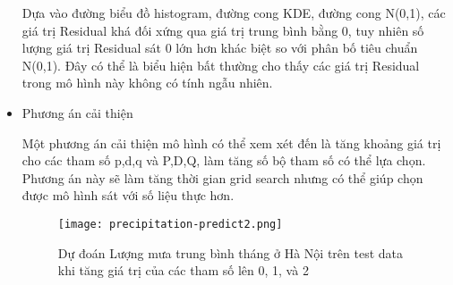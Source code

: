 \documentclass[12pt]{article}
\begin{document}
\begin{itemize}
            Dựa vào đường biểu đồ histogram, đường cong KDE, đường cong N(0,1), các giá trị Residual khá đối xứng qua giá trị trung bình bằng 0, tuy nhiên số lượng giá trị Residual sát 0 lớn hơn khác biệt so với phân bố tiêu chuẩn N(0,1). Đây có thể là biểu hiện bất thường cho thấy các giá trị Residual trong mô hình này không có tính ngẫu nhiên.
            
            \item Phương án cải thiện
            
            Một phương án cải thiện mô hình có thể xem xét đến là tăng khoảng giá trị cho các tham số p,d,q và P,D,Q, làm tăng số bộ tham số có thể lựa chọn. Phương án này sẽ làm tăng thời gian grid search nhưng có thể giúp chọn được mô hình sát với số liệu thực hơn.
            
            \begin{figure}[H]
                \centering
                \texttt{[image: precipitation-predict2.png]}
                \caption{Dự đoán Lượng mưa trung bình tháng ở Hà Nội trên test data khi tăng giá trị của các tham số lên 0, 1, và 2}
            \end{figure}
            
    \end{itemize}
    
\end{document}
